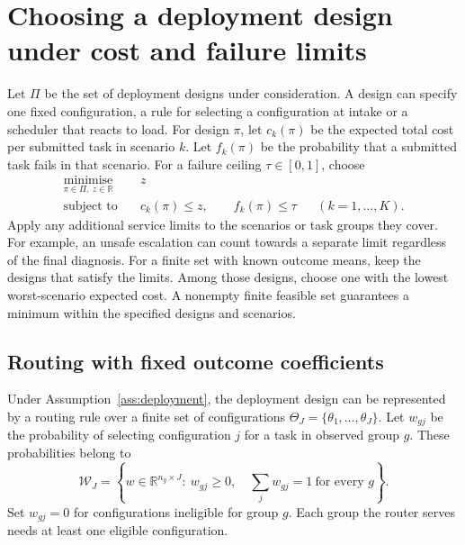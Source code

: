 \documentclass[11pt,reqno]{amsart}
\theoremstyle{definition}
\theoremstyle{remark}
\begin{document}
\section{Choosing a deployment design under cost and failure limits}
\label{sec:selection}

Let \(\Pi\) be the set of deployment designs under consideration. A design can specify one fixed configuration, a rule for selecting a configuration at intake or a scheduler that reacts to load. For design \(\pi\), let \(c_k(\pi)\) be the expected total cost per submitted task in scenario \(k\). Let \(f_k(\pi)\) be the probability that a submitted task fails in that scenario.
For a failure ceiling \(\tau\in[0,1]\), choose
\begin{equation}
 \begin{aligned}
 \underset{\pi\in\Pi,\ z\in\mathbb R}{\operatorname{minimise}}\quad &z\\
 \text{subject to}\quad &c_k(\pi)\le z,\qquad f_k(\pi)\le\tau
                         &&(k=1,\ldots,K).
 \end{aligned}
 \label{eq:deployment-choice}
\end{equation}
Apply any additional service limits to the scenarios or task groups they cover. For example, an unsafe escalation can count towards a separate limit regardless of the final diagnosis. For a finite set with known outcome means, keep the designs that satisfy the limits. Among those designs, choose one with the lowest worst-scenario expected cost. A nonempty finite feasible set guarantees a minimum within the specified designs and scenarios.

\subsection{Routing with fixed outcome coefficients}

Under Assumption~\ref{ass:deployment}, the deployment design can be represented by a routing rule over a finite set of configurations \(\Theta_J=\{\theta_1,\ldots,\theta_J\}\). Let \(w_{gj}\) be the probability of selecting configuration \(j\) for a task in observed group \(g\). These probabilities belong to
\begin{equation}
 \mathcal W_J=
 \left\{w\in\mathbb R^{n_g\times J}:\
 w_{gj}\ge0,\quad \sum_jw_{gj}=1\ \text{for every }g\right\}.
 \label{eq:simplex}
\end{equation}
Set \(w_{gj}=0\) for configurations ineligible for group \(g\). Each group the router serves needs at least one eligible configuration.
\end{document}
